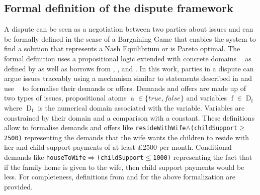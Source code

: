 \documentclass[12pt,msc,a4paper,oneside]{ucl_thesis}
\DeclareMathOperator{\Proplang}{\mathcal{L}(N)}
\DeclareMathOperator{\propatom}{a}
\DeclareMathOperator{\propvar}{f}
\DeclareMathOperator{\Propdom}{D}
\begin{document}
\subsection{Formal definition of the dispute framework} \label{sec:formalising_dispute}
A dispute can be seen as a negotiation between two parties about issues and can be formally defined in the sense of a Bargaining Game \cite{Nash:bargaining} \cite{Rubenstein} that enables the system to find a solution that represents a Nash Equilibrium or is Pareto optimal. The formal definition uses a propositional logic extended with concrete domains $\Proplang$ as defined by \cite{Ragone2008} as well as borrows from \cite{Lodder:ORD_system_design}, \cite{DBLP:journals:corr:ZhangZ14a}, \cite{Bellucci:2004:IAI:1032651.1033678} and \cite{Hemaissia:2007:MMN:1329125.1329314}.
In this work, parties in a dispute can argue issues traceably using a mechanism similar to statements described in \cite{Bellucci:2004:IAI:1032651.1033678} and use $\Proplang$ to formalise their demands or offers. Demands and offers are made up of two types of issues, propositional atoms $\propatom \in \{true, false\}$ and variables $\propvar \in \Propdom_{\propvar}$ where $\Propdom_{\propvar}$ is the numerical domain associated with the variable. Variables are constrained by their domain and a comparison with a constant. These definitions allow to formalise demands and offers like \texttt{resideWithWife$\wedge$(childSupport$\geq$2500)} representing the demands that the wife wants the children to reside with her and child support payments of at least £2500 per month. Conditional demands like \texttt{houseToWife$\Rightarrow$(childSupport$\leq$1000)} representing the fact that if the family home is given to the wife, then child support payments would be less. For completeness, definitions from \cite{Ragone2008} and \cite{Baader:1991:SIC:1631171.1631239} for the above formalization are provided.
\end{document}
